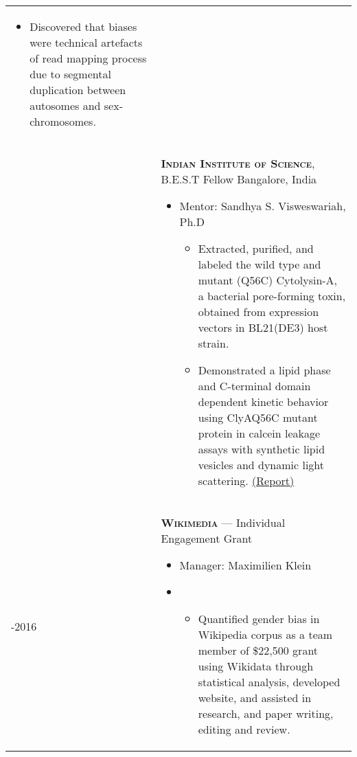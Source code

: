 \documentclass[11pt, letterpaper, oneside]{article}
\newcommand{\shorty}[1]{
  {\sectionfont\scshape\bfseries #1}}
\newenvironment{innerlist}[1][\enskip\textbullet]%
{\begin{itemize}[#1,leftmargin=0pt,parsep=0pt,itemsep=0pt,topsep=0pt,partopsep=0pt]}
{\end{itemize}}
\begin{document}
\begin{tabularx}{\textwidth}{>{\hsize=0.15\hsize}XX}
\begin{innerlist}
\begin{itemize}[]
           		\item Discovered that biases were technical artefacts of read mapping process due to segmental duplication between autosomes and sex-chromosomes.
            \end{itemize}
        \end{innerlist} \\
2015 & \shorty{Indian Institute of Science}, B.E.S.T Fellow \hfill Bangalore, India
        \begin{innerlist}
       	  \item[] Mentor: Sandhya S. Visweswariah, Ph.D
          	\begin{itemize}[]
           		\item Extracted, purified, and labeled the wild type and mutant (Q56C) Cytolysin-A, a bacterial pore-forming toxin, obtained from expression vectors in BL21(DE3) host strain.
           		\item Demonstrated a lipid phase and C-terminal domain dependent kinetic behavior using ClyAQ56C mutant protein in calcein leakage assays with synthetic lipid vesicles and dynamic light scattering. {\small
            {\href{https://vivekiitkgp.github.io/science/intern-at-iisc-2.html}{(Report)}}}
          \end{itemize}
        \end{innerlist} \\
2015-2016 & \shorty{Wikimedia} --- Individual Engagement Grant
        \begin{innerlist}
          \setlength{\itemsep}{1pt}
		  \item[] Manager: Maximilien Klein
          \item[]
          	\begin{itemize}[]
           		\item Quantified gender bias in Wikipedia corpus as a team member of \$22,500 grant using Wikidata through statistical analysis, developed website, and assisted in research, and paper writing, editing and review.
          \end{itemize}
        \end{innerlist}
\end{tabularx}
\end{document}
